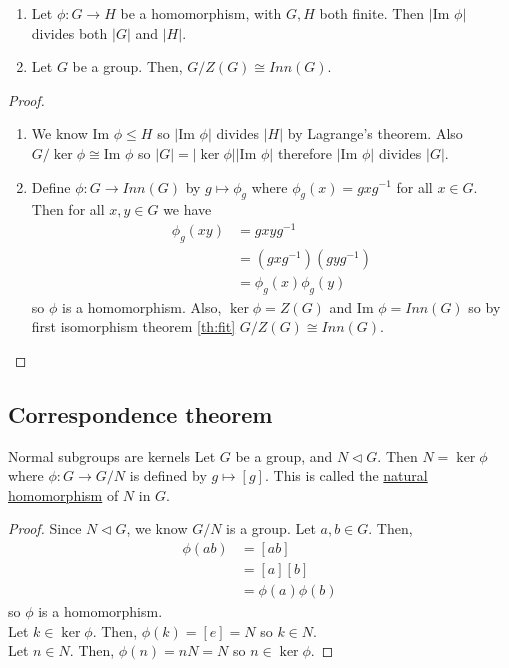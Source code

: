 \documentclass[12pt]{article}
\newcommand{\inv}{^{-1}}
\renewcommand{\Im}{\text{Im }}
\begin{document}
	\begin{mycor}{}{}
		\begin{enumerate}
			\item Let $\phi:G\to H$ be a homomorphism, with $G, H$ both finite. Then $|\Im\phi|$ divides both $|G|$ and $|H|$.
			
			\item Let $G$ be a group. Then, $G/Z(G)\cong Inn(G)$.
		\end{enumerate}
		\begin{proof}~\\
			\begin{enumerate}
				\item We know $\Im\phi\leq H$ so $|\Im\phi|$ divides $|H|$ by Lagrange's theorem. Also $G/\ker\phi\cong\Im\phi$ so $|G|=|\ker\phi||\Im\phi|$ therefore $|\Im\phi|$ divides $|G|$.
				
				\item Define $\phi:G\to Inn(G)$ by $g\mapsto\phi_g$ where $\phi_g(x)=gxg\inv$ for all $x\in G$. Then for all $x, y\in G$ we have
				\begin{align*}
					\phi_g(xy)&=gxyg\inv\\
					&=(gxg\inv)(gyg\inv)\\
					&=\phi_g(x)\phi_g(y)
				\end{align*}
				so $\phi$ is a homomorphism. Also, $\ker\phi=Z(G)$ and $\Im\phi=Inn(G)$ so by first isomorphism theorem \ref{th:fit} $G/Z(G)\cong Inn(G)$.
			\end{enumerate}
		\end{proof}
	\end{mycor}
	
	\subsection{Correspondence theorem}	
	
	\begin{mythm}{Normal subgroups are kernels}{}
		Let $G$ be a group, and $N\lhd G$. Then $N=\ker\phi$ where $\phi:G\to G/N$ is defined by $g\mapsto[g]$. This is called the \underline{natural homomorphism} of $N$ in $G$.
		\begin{proof}
			Since $N\lhd G$, we know $G/N$ is a group. Let $a, b\in G$. Then,
			\begin{align*}
				\phi(ab)&=[ab]\\
				&=[a][b]\\
				&=\phi(a)\phi(b)
			\end{align*}
			so $\phi$ is a homomorphism.\\
			
			Let $k\in\ker\phi$. Then, $\phi(k)=[e]=N$ so $k\in N$.\\
			
			Let $n\in N$. Then, $\phi(n)=nN=N$ so $n\in\ker\phi$.
		\end{proof}
	\end{mythm}
	
\end{document}
